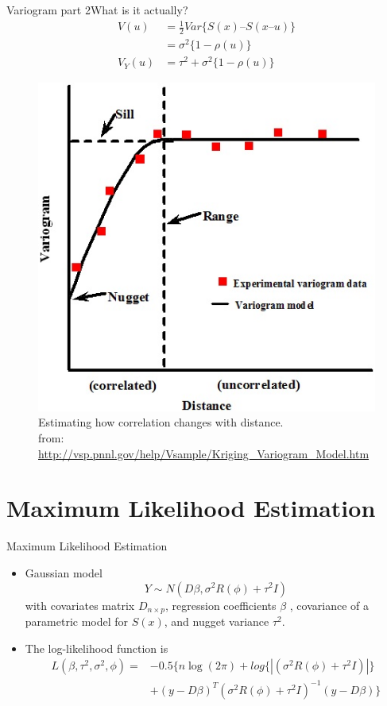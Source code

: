 \documentclass{beamer}
\begin{document}
\begin{frame}{Variogram part 2}{What is it actually?}
	\begin{align}
		V(u) &= \frac{1}{2}Var \{S(x) – S(x – u)\} \\
        &= \sigma^2\{1-\rho(u)\}\\
        V_Y(u) &= \tau^2 + \sigma^2\{1-\rho(u)\}
	\end{align}
  	\begin{figure}
	\centering
		\includegraphics[scale = 0.5]{Images/VariogramSummary.jpg}
		\caption{ { \scriptsize Estimating how correlation changes with distance. \\from: \url{http://vsp.pnnl.gov/help/Vsample/Kriging_Variogram_Model.htm}
}}
	\end{figure} 
\end{frame}


\section{Maximum Likelihood Estimation}
\begin{frame}{Maximum Likelihood Estimation}
	\begin{itemize}
		\item Gaussian model
		$$Y \sim N(D\beta, \sigma^2 R(\phi) + \tau^2I) $$
		with covariates matrix $D_{n\times p}$, regression coefficients $\beta$ ,  covariance of a parametric model for $S(x)$, and nugget variance $\tau^2$. 
		\item The log-likelihood function is 
		\begin{align*}
		L(\beta, \tau^2, \sigma^2, \phi) =  &- 0.5 \{n \log(2\pi) + log\{|(\sigma^2 R(\phi) +\tau^2 I) | \} \\
		&+ (y-D\beta)^T(\sigma^2 R(\phi) + \tau^2 I)^{-1} (y - D\beta)\}
		\end{align*}
	\end{itemize}
\end{frame}
\end{document}
